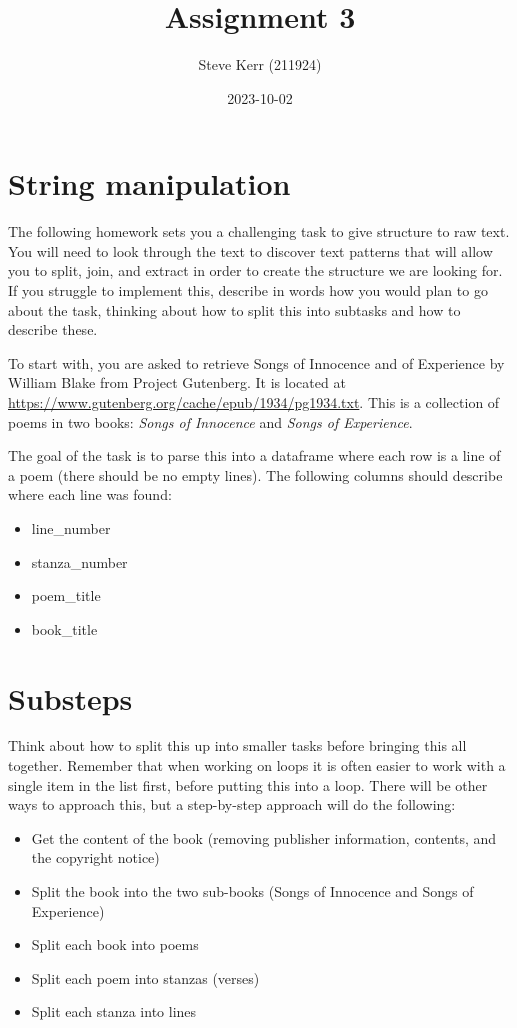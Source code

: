 \documentclass[
]{article}
\title{Assignment 3}
\author{Steve Kerr (211924)}
\date{2023-10-02}
\providecommand{\tightlist}{%
  \setlength{\itemsep}{0pt}\setlength{\parskip}{0pt}}
\begin{document}
\maketitle

\hypertarget{string-manipulation}{%
\section{String manipulation}\label{string-manipulation}}

The following homework sets you a challenging task to give structure to
raw text. You will need to look through the text to discover text
patterns that will allow you to split, join, and extract in order to
create the structure we are looking for. If you struggle to implement
this, describe in words how you would plan to go about the task,
thinking about how to split this into subtasks and how to describe
these.

To start with, you are asked to retrieve Songs of Innocence and of
Experience by William Blake from Project Gutenberg. It is located at
\url{https://www.gutenberg.org/cache/epub/1934/pg1934.txt}. This is a
collection of poems in two books: \emph{Songs of Innocence} and
\emph{Songs of Experience}.

The goal of the task is to parse this into a dataframe where each row is
a line of a poem (there should be no empty lines). The following columns
should describe where each line was found:

\begin{itemize}
\tightlist
\item
  line\_number
\item
  stanza\_number
\item
  poem\_title
\item
  book\_title
\end{itemize}

\hypertarget{substeps}{%
\section{Substeps}\label{substeps}}

Think about how to split this up into smaller tasks before bringing this
all together. Remember that when working on loops it is often easier to
work with a single item in the list first, before putting this into a
loop. There will be other ways to approach this, but a step-by-step
approach will do the following:

\begin{itemize}
\tightlist
\item
  Get the content of the book (removing publisher information, contents,
  and the copyright notice)
\item
  Split the book into the two sub-books (Songs of Innocence and Songs of
  Experience)
\item
  Split each book into poems
\item
  Split each poem into stanzas (verses)
\item
  Split each stanza into lines
\end{itemize}
\end{document}
